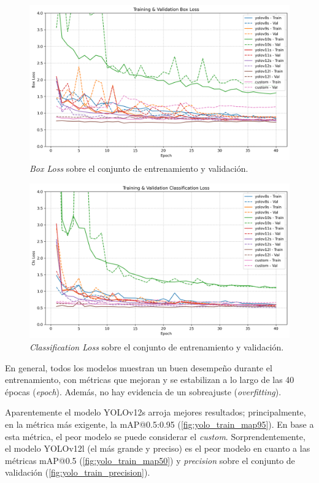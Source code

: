 \documentclass[12pt,a4paper,onecolumn,oneside]{report}
\begin{document}
\begin{figure}[H]
  \centering
  \includegraphics[width=1.0\textwidth]{figuras/yolo_plots/box_loss.png}
  \caption{\textit{Box Loss} sobre el conjunto de entrenamiento y validación.}
  \label{fig:yolo_train_box_loss}
\end{figure}

\begin{figure}[H]
  \centering
  \includegraphics[width=1.0\textwidth]{figuras/yolo_plots/cls_loss.png}
  \caption{\textit{Classification Loss} sobre el conjunto de entrenamiento y validación.}
  \label{fig:yolo_train_cls_loss}
\end{figure}

En general, todos los modelos muestran un buen desempeño durante el entrenamiento, con métricas que mejoran y se estabilizan a lo largo de las 40 épocas (\textit{epoch}). Además, 
no hay evidencia de un sobreajuste (\textit{overfitting}).

Aparentemente el modelo YOLOv12s arroja mejores resultados; principalmente, en la métrica más exigente, la mAP@0.5:0.95 (\autoref{fig:yolo_train_map95}). En base a esta métrica, el peor modelo se puede considerar el \textit{custom}.
Sorprendentemente, el modelo YOLOv12l (el más grande y preciso) es el peor modelo en cuanto a las métricas mAP@0.5 (\autoref{fig:yolo_train_map50}) y \textit{precision} sobre el conjunto de validación (\autoref{fig:yolo_train_precision}). 
\end{document}
